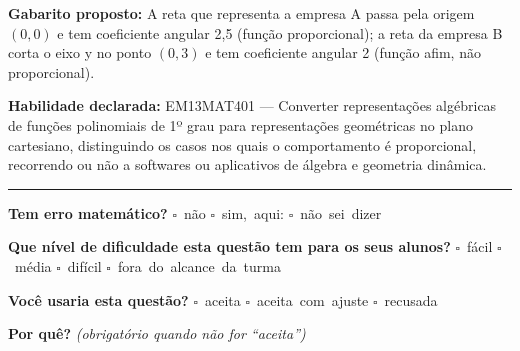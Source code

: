 \documentclass[11pt,a4paper]{article}
\begin{document}
\begin{samepage}
\textbf{Gabarito proposto:} A reta que representa a empresa A passa pela origem $(0,0)$ e tem coeficiente angular 2,5 (função proporcional); a reta da empresa B corta o eixo y no ponto $(0,3)$ e tem coeficiente angular 2 (função afim, não proporcional).

\textbf{Habilidade declarada:} EM13MAT401 --- Converter representações algébricas de funções polinomiais de 1º grau para representações geométricas no plano cartesiano, distinguindo os casos nos quais o comportamento é proporcional, recorrendo ou não a softwares ou aplicativos de álgebra e geometria dinâmica.
\end{samepage}

\noindent\rule{\linewidth}{0.4pt}
\textbf{Tem erro matemático?}\quad
\mbox{$\square$~não} \quad \mbox{$\square$~sim, aqui:} \underline{\hspace{5cm}}
\quad \mbox{$\square$~não sei dizer}

\textbf{Que nível de dificuldade esta questão tem para os seus alunos?}\quad
\mbox{$\square$~fácil} \quad \mbox{$\square$~média} \quad
\mbox{$\square$~difícil} \quad \mbox{$\square$~fora do alcance da turma}

\textbf{Você usaria esta questão?}\quad
\mbox{$\square$~aceita} \quad \mbox{$\square$~aceita com ajuste} \quad
\mbox{$\square$~recusada}

\textbf{Por quê?} \emph{(obrigatório quando não for ``aceita'')}

\underline{\hspace{\linewidth}}

\underline{\hspace{\linewidth}}
\vspace{0.6em}
\end{document}
